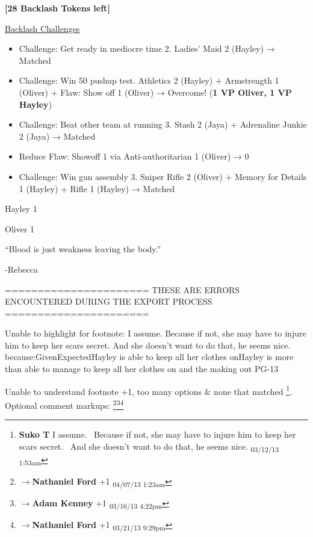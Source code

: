 \textbf{{[}28 Backlash Tokens left{]}}



\underline{  {\LARGE Backlash Challenges }  }



\begin{itemize}
\item Challenge: Get ready in mediocre time 2.  Ladies' Maid 2 (Hayley) → Matched
\item Challenge: Win 50 pushup test. Athletics 2 (Hayley) + Armstrength 1 (Oliver) +  {\color[RGB]{255,0,0}Flaw: Show off 1}  (Oliver) → Overcome! (\textbf{1 VP Oliver, 1 VP Hayley})
\item Challenge: Beat other team at running 3.  Stash 2 (Jaya) + Adrenaline Junkie 2 (Jaya) → Matched
\item Reduce Flaw: Showoff 1 via Anti-authoritarian 1 (Oliver) → 0
\item Challenge: Win gun assembly 3. Sniper Rifle 2 (Oliver) + Memory for Details 1 (Hayley) + Rifle 1 (Hayley)  → Matched
\end{itemize}



Hayley 1

Oliver 1



``Blood is just weakness leaving the body.''

        -Rebecca


\iffalse

======================
THESE ARE ERRORS ENCOUNTERED DURING THE EXPORT PROCESS
======================

	Unable to highlight for footnote: I assume.  Because if not, she may have to injure him to keep her scars secret.  And she doesn't want to do that, he seems nice. because:GivenExpectedHayley is able to keep all her clothes onHayley is more than able to manage to keep all her clothes on and the making out PG-13

	Unable to understand footnote +1, too many options & none that matched \footnote{\textbf{Suko T }I assume.  Because if not, she may have to injure him to keep her scars secret.  And she doesn't want to do that, he seems nice. \textsubscript{03/12/13 1:53am}}. Optional comment markups: \footnote{$\rightarrow$\textbf{Nathaniel Ford }+1 \textsubscript{04/07/13 1:23am}}\footnote{$\rightarrow$\textbf{Adam Kenney }+1 \textsubscript{03/16/13 4:22pm}}\footnote{$\rightarrow$\textbf{Nathaniel Ford }+1 \textsubscript{03/21/13 9:29pm}} 

